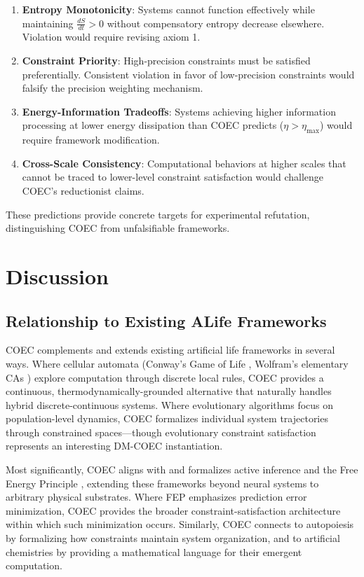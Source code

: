 \documentclass[11pt]{article}
\begin{document}
\begin{enumerate}
\item \textbf{Entropy Monotonicity}: Systems cannot function effectively while maintaining $\frac{dS}{dt} > 0$ without compensatory entropy decrease elsewhere. Violation would require revising axiom 1.

\item \textbf{Constraint Priority}: High-precision constraints must be satisfied preferentially. Consistent violation in favor of low-precision constraints would falsify the precision weighting mechanism.

\item \textbf{Energy-Information Tradeoffs}: Systems achieving higher information processing at lower energy dissipation than COEC predicts ($\eta > \eta_{\text{max}}$) would require framework modification.

\item \textbf{Cross-Scale Consistency}: Computational behaviors at higher scales that cannot be traced to lower-level constraint satisfaction would challenge COEC's reductionist claims.
\end{enumerate}

These predictions provide concrete targets for experimental refutation, distinguishing COEC from unfalsifiable frameworks.

\section{Discussion}
\label{sec:discussion}

\subsection{Relationship to Existing ALife Frameworks}

COEC complements and extends existing artificial life frameworks in several ways. Where cellular automata (Conway's Game of Life \citep{gardner1970life}, Wolfram's elementary CAs \citep{wolfram2002new}) explore computation through discrete local rules, COEC provides a continuous, thermodynamically-grounded alternative that naturally handles hybrid discrete-continuous systems. Where evolutionary algorithms \citep{holland1992adaptation} focus on population-level dynamics, COEC formalizes individual system trajectories through constrained spaces—though evolutionary constraint satisfaction represents an interesting DM-COEC instantiation.

Most significantly, COEC aligns with and formalizes active inference and the Free Energy Principle \citep{friston2010free,ramstead2018answering}, extending these frameworks beyond neural systems to arbitrary physical substrates. Where FEP emphasizes prediction error minimization, COEC provides the broader constraint-satisfaction architecture within which such minimization occurs. Similarly, COEC connects to autopoiesis \citep{maturana1991autopoiesis} by formalizing how constraints maintain system organization, and to artificial chemistries \citep{dittrich2001artificial} by providing a mathematical language for their emergent computation.
\end{document}
